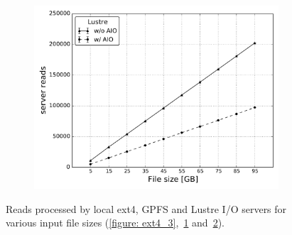 \begin{figure}[]
\begin{subfigure}[]{0.70\textwidth}
    \caption{\textit{}}
    \label{figure: gpfs_3}
  \end{subfigure}
  \begin{subfigure}[]{0.70\textwidth}
    \centering
    \includegraphics[width=\textwidth]{figures/Lustre/server_reads}
    \caption{\textit{}}
    \label{figure: lustre_3}
  \end{subfigure}
  \caption{Reads processed by local ext4, GPFS and Lustre I/O servers for various input file sizes (\ref{figure: ext4_3},~\ref{figure: gpfs_3} and~\ref{figure: lustre_3}).}
  \label{figure: read_1}
\end{figure}

